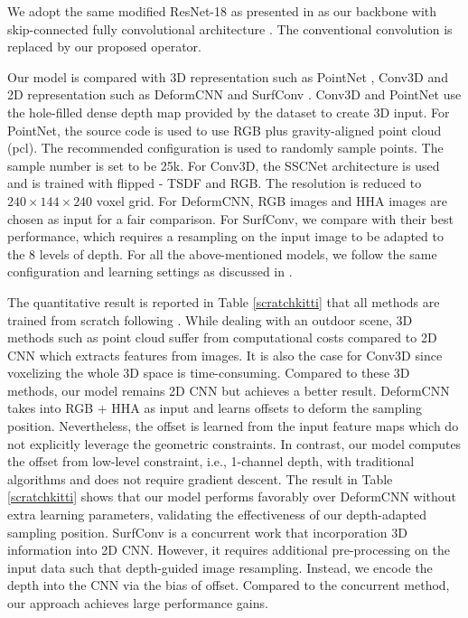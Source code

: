 \documentclass[lettersize,journal]{IEEEtran}
\begin{document}
We adopt the same modified ResNet-18 as presented in \cite{chu2018surfconv} as our backbone with skip-connected fully convolutional architecture \cite{Long2015FCN}. The conventional convolution is replaced by our proposed operator. 

Our model is compared with 3D representation such as PointNet \cite{Qi2017pointnet}, Conv3D \cite{tchapmi2017segcloud,song2017semantic} and 2D representation such as DeformCNN \cite{dai2017deformable} and SurfConv \cite{chu2018surfconv}. Conv3D \cite{tchapmi2017segcloud,song2017semantic} and PointNet \cite{Qi2017pointnet} use the hole-filled dense depth map provided by the dataset to create 3D input. For PointNet, the source code is used to use RGB plus gravity-aligned point cloud (pcl). The recommended configuration \cite{Qi2017pointnet} is used to randomly sample points. The sample number is set to be 25k. For Conv3D, the SSCNet architecture \cite{tchapmi2017segcloud} is used and is trained with flipped - TSDF and RGB. The resolution is reduced to $240\times144\times240$ voxel grid. For DeformCNN, RGB images and HHA images are chosen as input for a fair comparison.  For SurfConv, we compare with their best performance, which requires a resampling on the input image to be adapted to the 8 levels of depth. For all the above-mentioned models, we follow the same configuration and learning settings as discussed in \cite{chu2018surfconv}.

The quantitative result is reported in Table \ref{scratchkitti} that all methods are trained from scratch following \cite{chu2018surfconv}. While dealing with an outdoor scene, 3D methods such as point cloud suffer from computational costs compared to 2D CNN which extracts features from images. It is also the case for Conv3D \cite{tchapmi2017segcloud,song2017semantic} since voxelizing the whole 3D space is time-consuming. Compared to these 3D methods, our model remains 2D CNN but achieves a better result. DeformCNN \cite{dai2017deformable} takes into RGB + HHA as input and learns offsets to deform the sampling position. Nevertheless, the offset is learned from the input feature maps which do not explicitly leverage the geometric constraints. In contrast, our model computes the offset from low-level constraint, i.e., 1-channel depth, with traditional algorithms and does not require gradient descent. The result in Table \ref{scratchkitti} shows that our model performs favorably over DeformCNN without extra learning parameters, validating the effectiveness of our depth-adapted sampling position. SurfConv is a concurrent work that incorporation 3D information into 2D CNN. However, it requires additional pre-processing on the input data such that depth-guided image resampling. Instead, we encode the depth into the CNN via the bias of offset. Compared to the concurrent method, our approach achieves large performance gains.
\end{document}
